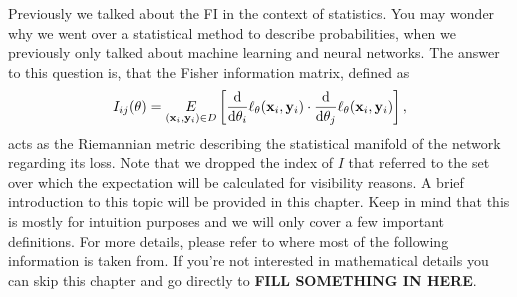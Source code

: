Previously we talked about the FI in the context of statistics. You may wonder why we went over a statistical method to describe probabilities, when we previously only talked about machine learning and neural networks. The answer to this question is, that the Fisher information matrix, defined as 
\begin{equation}
	I_{ij}(\theta) = \underset{(\mathbf{x}_i,\mathbf{y}_i) \in D}{E} \left[\frac{\mathrm{d}}{\mathrm{d}\theta_i}\ell_\theta(\mathbf{x}_i,\mathbf{y}_i)\cdot \frac{\mathrm{d}}{\mathrm{d}\theta_j}\ell_\theta(\mathbf{x}_i,\mathbf{y}_i)\right],
\end{equation}
acts as the Riemannian metric describing the statistical manifold of the network regarding its loss. Note that we dropped the index of $I$ that referred to the set over which the expectation will be calculated for visibility reasons. A brief introduction to this topic will be provided in this chapter. Keep in mind that this is mostly for intuition purposes and we will only cover a few important definitions. For more details, please refer to \cite{AmarisLectureNotes} where most of the following information is taken from. If you're not interested in mathematical details you can skip this chapter and go directly to \textbf{FILL SOMETHING IN HERE}.

